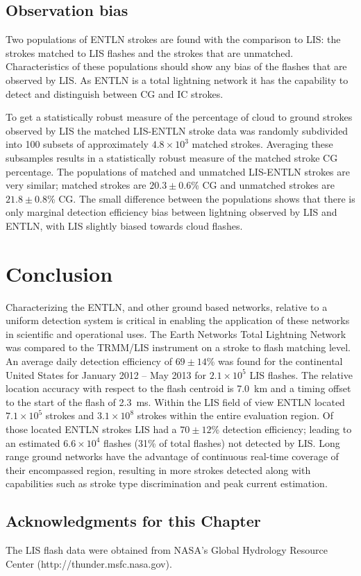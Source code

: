 \subsection{Observation bias}

Two populations of ENTLN strokes are found with the comparison to LIS: the strokes matched to LIS flashes and the strokes that are unmatched.
Characteristics of these populations should show any bias of the flashes that are observed by LIS.
As ENTLN is a total lightning network it has the capability to detect and distinguish between CG and IC strokes.

To get a statistically robust measure of the percentage of cloud to ground strokes observed by LIS the matched LIS-ENTLN stroke data was randomly subdivided into 100 subsets of approximately $4.8\times10^3$ matched strokes.
Averaging these subsamples results in a statistically robust measure of the matched stroke CG percentage.
The populations of matched and unmatched LIS-ENTLN strokes are very similar; matched strokes are $20.3\pm0.6$\% CG and unmatched strokes are $21.8\pm0.8$\% CG.
The small difference between the populations shows that there is only marginal detection efficiency bias between lightning observed by LIS and ENTLN, with LIS slightly biased towards cloud flashes.

\section{Conclusion}

Characterizing the ENTLN, and other ground based networks, relative to a uniform detection system is critical in enabling the application of these networks in scientific and operational uses.
The Earth Networks Total Lightning Network was compared to the TRMM/LIS instrument on a stroke to flash matching level.
An average daily detection efficiency of $69\pm 14$\% was found for the continental United States for January 2012 -- May 2013 for $2.1 \times 10^5$ LIS flashes.
The relative location accuracy with respect to the flash centroid is 7.0~km and a timing offset to the start of the flash of 2.3~ms.
Within the LIS field of view ENTLN located $7.1\times 10^5$ strokes and $3.1\times10^8$ strokes within the entire evaluation region.
Of those located ENTLN strokes LIS had a $70 \pm 12$\% detection efficiency; leading to an estimated $6.6 \times 10^4$ flashes (31\% of total flashes) not detected by LIS.
Long range ground networks have the advantage of continuous real-time coverage of their encompassed region, resulting in more strokes detected along with capabilities such as stroke type discrimination and peak current estimation.

\subsection*{Acknowledgments for this Chapter}

The LIS flash data were obtained from NASA's Global Hydrology Resource Center (http://thunder.msfc.nasa.gov).
